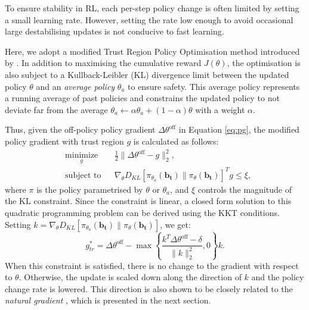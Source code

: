 \documentclass[11pt,a4paper]{article}
\begin{document}
To ensure  stability in RL, each per-step policy change is often limited by setting a small learning rate. However, 
setting the rate low enough to avoid occasional large destabilising updates is not conducive to fast learning.

Here, we adopt a modified Trust Region Policy Optimisation method introduced by . In addition to maximising the cumulative reward $J(\theta)$, the optimisation is also subject to a Kullback-Leibler (KL) divergence limit between the updated policy $\theta$ and an {\it average policy}  $\theta_a$ to ensure safety. This average policy represents a running average of past policies and constrains the updated policy to not deviate far from the average $\theta_a \leftarrow \alpha \theta_a + (1- \alpha)\theta$ with a weight $\alpha$.

Thus, given the off-policy policy gradient $\Delta \theta^{\textrm{off}}$ in Equation \ref{eq:pg}, the modified policy gradient with trust region $g$ is calculated as follows: 
\begin{equation*}
\label{eqn:trust}
\begin{aligned}
  & \underset{g}{\text{minimize}}
  & & \frac{1}{2}\| {\Delta \theta^{\textrm{off}}} - g\|^2_2, \\
  & \text{subject to}
  & & \nabla_{{\theta}} D_{KL}\left[\pi_{\theta_a}(\mathbf{b_t}) \| \pi_{\theta}(\mathbf{b_t}) \right]^T g \leq \xi,
\end{aligned}
\end{equation*}
where $\pi$ is the policy parametrised by $\theta$ or $\theta_a$, and $\xi$ controls the magnitude of the KL constraint.
Since the constraint is linear, a closed form solution to this quadratic programming problem can be derived using the KKT conditions. Setting $k = \nabla_{{\theta}} D_{KL}\left[\pi_{\theta_a}(\mathbf{b_t}) \| \pi_{\theta}(\mathbf{b_t}) \right]$, we get:
\begin{equation}
g^*_{tr} = \Delta \theta^{\textrm{off}} - \max\left\{ \frac{ k^T \Delta \theta^{\textrm{off}} - \delta}{\| k\|^2_2},0\right\} k.
\label{eq:new_pg}
\end{equation}
When this constraint is satisfied, there is no change to the gradient with respect to $\theta$. Otherwise, the update is scaled down along the direction of $k$ and the policy change rate is lowered. This direction is also shown to be closely related to the {\it natural gradient} \cite{amari1998natural,schulman2015trust}, which is presented in the next section.
\end{document}
